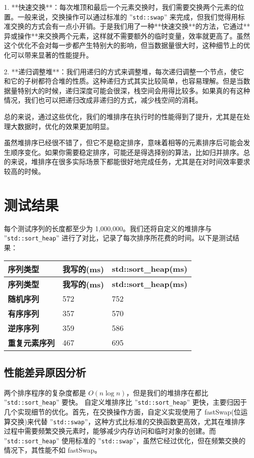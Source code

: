 \documentclass{article}
\begin{document}
1. **快速交换**：每次堆顶和最后一个元素交换时，我们需要交换两个元素的位置。一般来说，交换操作可以通过标准的 ''\texttt{std::swap}'' 来完成，但我们觉得用标准交换的方式会有一点小开销。于是我们用了一种**快速交换**的方法，它通过**异或操作**来交换两个元素，这样就不需要额外的临时变量，效率就更高了。虽然这个优化不会对每一步都产生特别大的影响，但当数据量很大时，这种细节上的优化可以带来显著的性能提升。

2. **递归调整堆**：我们用递归的方式来调整堆，每次递归调整一个节点，使它和它的子树都符合堆的性质。这种递归方式其实比较简单，也容易理解。但是当数据量特别大的时候，递归深度可能会很深，栈空间会用得比较多。如果真的有这种情况，我们也可以把递归改成非递归的方式，减少栈空间的消耗。

总的来说，通过这些优化，我们的堆排序在执行时的性能得到了提升，尤其是在处理大数据时，优化的效果更加明显。

虽然堆排序已经很不错了，但它不是稳定排序，意味着相等的元素排序后可能会发生顺序变化。如果你需要稳定排序，可能还是得选择别的算法，比如归并排序。总的来说，堆排序在很多实际场景下都能很好地完成任务，尤其是在对时间效率要求较高的时候。

\section{测试结果}

每个测试序列的长度都至少为 1,000,000。我们还将自定义的堆排序与 ''\texttt{std::sort\_heap}'' 进行了对比，记录了每次排序所花费的时间。以下是测试结果：

\begin{longtable}{|l|l|l|}
\hline
\textbf{序列类型} & \textbf{我写的(ms)} & \textbf{std::sort\_heap(ms)} \\
\hline
\endfirsthead
\hline
\textbf{序列类型} & \textbf{我写的(ms)} & \textbf{std::sort\_heap(ms)} \\
\hline
\endhead
\hline
\textbf{随机序列} & 572 & 752 \\
\textbf{有序序列} & 357 & 570 \\
\textbf{逆序序列} & 359 & 586 \\
\textbf{重复元素序列} & 467 & 695 \\
\hline
\end{longtable}

\subsection{性能差异原因分析}

两个排序程序的复杂度都是 $O(n \log n)$，但是我们的堆排序在都比 ''\texttt{std::sort\_heap}'' 要快。
自定义堆排序比 ''\texttt{std::sort\_heap}'' 更快，主要归因于几个实现细节的优化。首先，在交换操作方面，自定义实现使用了 fastSwap(位运算交换)来代替 ''\texttt{std::swap}''，这种方式比标准的交换函数更高效，尤其在堆排序过程中需要频繁交换元素时，能够减少内存访问和临时对象的创建。而 ''\texttt{std::sort\_heap}'' 使用标准的 ''\texttt{std::swap}''，虽然它经过优化，但在频繁交换的情况下，其性能不如 fastSwap。
\end{document}
